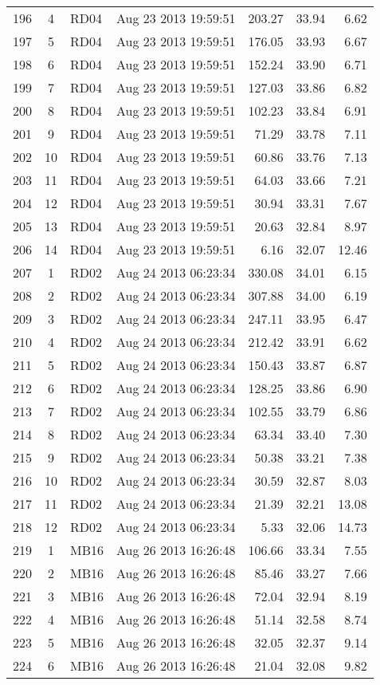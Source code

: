 \begin{longtable}{ccllrrr}
196&4&RD04&Aug 23 2013 19:59:51&203.27&33.94&6.62\\
197&5&RD04&Aug 23 2013 19:59:51&176.05&33.93&6.67\\
198&6&RD04&Aug 23 2013 19:59:51&152.24&33.90&6.71\\
199&7&RD04&Aug 23 2013 19:59:51&127.03&33.86&6.82\\
200&8&RD04&Aug 23 2013 19:59:51&102.23&33.84&6.91\\
201&9&RD04&Aug 23 2013 19:59:51&71.29&33.78&7.11\\
202&10&RD04&Aug 23 2013 19:59:51&60.86&33.76&7.13\\
203&11&RD04&Aug 23 2013 19:59:51&64.03&33.66&7.21\\
204&12&RD04&Aug 23 2013 19:59:51&30.94&33.31&7.67\\
205&13&RD04&Aug 23 2013 19:59:51&20.63&32.84&8.97\\
206&14&RD04&Aug 23 2013 19:59:51&6.16&32.07&12.46\\
\hline 
207&1&RD02&Aug 24 2013 06:23:34&330.08&34.01&6.15\\
208&2&RD02&Aug 24 2013 06:23:34&307.88&34.00&6.19\\
209&3&RD02&Aug 24 2013 06:23:34&247.11&33.95&6.47\\
210&4&RD02&Aug 24 2013 06:23:34&212.42&33.91&6.62\\
211&5&RD02&Aug 24 2013 06:23:34&150.43&33.87&6.87\\
212&6&RD02&Aug 24 2013 06:23:34&128.25&33.86&6.90\\
213&7&RD02&Aug 24 2013 06:23:34&102.55&33.79&6.86\\
214&8&RD02&Aug 24 2013 06:23:34&63.34&33.40&7.30\\
215&9&RD02&Aug 24 2013 06:23:34&50.38&33.21&7.38\\
216&10&RD02&Aug 24 2013 06:23:34&30.59&32.87&8.03\\
217&11&RD02&Aug 24 2013 06:23:34&21.39&32.21&13.08\\
218&12&RD02&Aug 24 2013 06:23:34&5.33&32.06&14.73\\
\hline 
219&1&MB16&Aug 26 2013 16:26:48&106.66&33.34&7.55\\
220&2&MB16&Aug 26 2013 16:26:48&85.46&33.27&7.66\\
221&3&MB16&Aug 26 2013 16:26:48&72.04&32.94&8.19\\
222&4&MB16&Aug 26 2013 16:26:48&51.14&32.58&8.74\\
223&5&MB16&Aug 26 2013 16:26:48&32.05&32.37&9.14\\
224&6&MB16&Aug 26 2013 16:26:48&21.04&32.08&9.82\\

\end{longtable}
